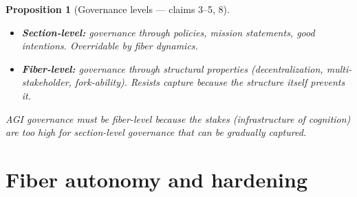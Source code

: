 \documentclass[11pt,a4paper]{article}
\newtheorem{proposition}[definition]{Proposition}
\begin{document}
\begin{proposition}[Governance levels --- claims 3--5, 8]
\label{prop:governance}
\begin{itemize}
  \item \textbf{Section-level:} governance through policies, mission
    statements, good intentions. Overridable by fiber dynamics.
  \item \textbf{Fiber-level:} governance through structural properties
    (decentralization, multi-stakeholder, fork-ability). Resists capture
    because the structure itself prevents it.
\end{itemize}
AGI governance must be fiber-level because the stakes (infrastructure
of cognition) are too high for section-level governance that can be
gradually captured.
\end{proposition}


\section{Fiber autonomy and hardening}
\label{sec:autonomy}
\end{document}
